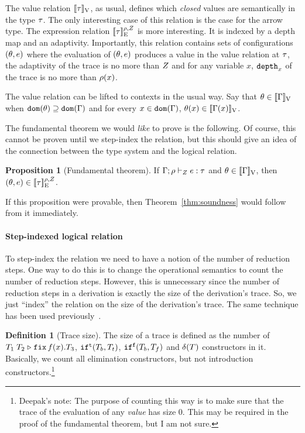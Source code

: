 \documentclass[a4paper,11pt]{article}
\theoremstyle{definition}
\newtheorem{prop}[thm]{Proposition}
\newtheorem{defn}[thm]{Definition}
\begin{document}
The value relation $[\![ \tau ]\!]_{\text{V}}$, as usual, defines which
\emph{closed} values are semantically in the type $\tau$. The only
interesting case of this relation is the case for the arrow type. The
expression relation $[\![ \tau ]\!]_{\text{E}}^{\rho, Z}$ is more
interesting. It is indexed by a depth map and an
adaptivity. Importantly, this relation contains sets of configurations
$(\theta, e)$ where the evaluation of $(\theta, e)$ produces a
value in the value relation at $\tau$, the adaptivity of the trace is
no more than $Z$ and for any variable $x$, $\mathtt{depth}_{x}$ of the
trace is no more than $\rho(x)$.

The value relation can be lifted to contexts in the usual way. Say
that $\theta \in [\![ \Gamma ]\!]_{\text{V}}$ when $\mathtt{dom}(\theta) \supseteq \mathtt{dom}(\Gamma)$
and for every $x \in \mathtt{dom}(\Gamma)$, $\theta(x) \in [\![ \Gamma(x) ]\!]_{\text{V}}$.

The fundamental theorem we would \emph{like} to prove is the
following. Of course, this cannot be proven until we step-index the
relation, but this should give an idea of the connection between the
type system and the logical relation.

\begin{prop}[Fundamental theorem]
\label{prop:fund}
  If $\Gamma; \rho \vdash_{Z} e: \tau$ and $ \theta \in
  [\![ \Gamma ]\!]_{\text{V}}$, then $(\theta, e) \in [\![ \tau ]\!]_{\text{E}}^{\rho, Z}$.
\end{prop}


If this proposition were provable, then Theorem~\ref{thm:soundness}
would follow from it immediately.

\paragraph{Step-indexed logical relation}
To step-index the relation we need to have a notion of the number of
reduction steps. One way to do this is to change the operational
semantics to count the number of reduction steps. However, this is
unnecessary since the number of reduction steps in a derivation is
exactly the size of the derivation's trace. So, we just ``index'' the
relation on the size of the derivation's trace. The same technique has
been used previously~\cite{cicek15}.

\begin{defn}[Trace size]
  The size of a trace is defined as the number of
  $T_1 \; T_2 \mathrel{\triangleright} {\mathop{\mathtt{fix}} f(x).T_3}$, $\mathtt{if}^{\mathtt{t}}(T_b, T_t)$,
  $\mathtt{if}^{\mathtt{f}}(T_b, T_f)$ and $\delta(T)$ constructors in
  it. Basically, we count all elimination constructors, but not
  introduction constructors.\footnote{Deepak's note: The purpose of
    counting this way is to make sure that the trace of the evaluation
    of any \emph{value} has size $0$. This may be required in the
    proof of the fundamental theorem, but I am not sure.}

\end{defn}
\end{document}
